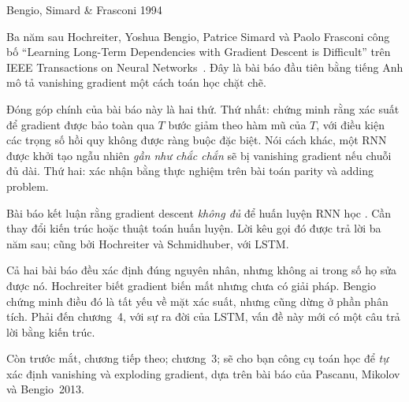 \begin{bridge}{Bengio, Simard \& Frasconi 1994}
%

Ba năm sau Hochreiter, Yoshua Bengio, Patrice Simard và Paolo Frasconi công
bố \enquote{Learning Long-Term Dependencies with Gradient Descent is
Difficult} trên IEEE Transactions on Neural Networks~\autocite{bengio1994}.
Đây là bài báo đầu tiên bằng tiếng Anh mô tả vanishing gradient một cách
toán học chặt chẽ.

Đóng góp chính của bài báo này là hai thứ. Thứ nhất: chứng minh rằng xác
suất để gradient được bảo toàn qua $T$ bước giảm theo hàm mũ của $T$, với
điều kiện các trọng số hồi quy không được ràng buộc đặc biệt. Nói cách khác,
một RNN được khởi tạo ngẫu nhiên \emph{gần như chắc chắn} sẽ bị vanishing
gradient nếu chuỗi đủ dài. Thứ hai: xác nhận bằng thực nghiệm trên bài toán
parity và adding problem.

Bài báo kết luận rằng gradient descent \emph{không đủ} để huấn luyện RNN học
. Cần thay đổi kiến trúc hoặc
thuật toán huấn luyện. Lời
kêu gọi đó được trả lời ba năm sau; cũng bởi Hochreiter và Schmidhuber, với
LSTM.

%
\end{bridge}

Cả hai bài báo đều xác định đúng nguyên nhân, nhưng không ai trong số họ sửa được
nó. Hochreiter biết gradient biến mất nhưng chưa có giải pháp. Bengio chứng
minh điều đó là tất yếu về mặt xác suất, nhưng cũng dừng ở phần phân tích. Phải
đến chương~4, với sự ra đời của LSTM, vấn đề này mới có một câu trả lời bằng
kiến trúc.

Còn trước mắt, chương tiếp theo; chương~3; sẽ cho bạn công cụ toán học để
\emph{tự} xác định vanishing và exploding gradient, dựa trên bài báo của
Pascanu, Mikolov và Bengio~2013.

